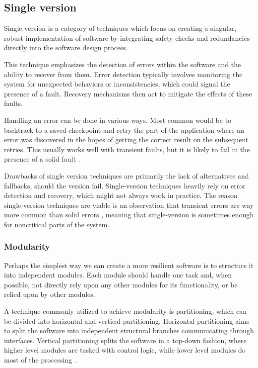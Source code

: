 
\subsection{Single version} \label{single}

Single version is a category of techniques which focus on creating a singular, robust implementation of software by integrating safety checks and redundancies directly into the software design process.

This technique emphasizes the detection of errors within the software and the ability to recover from them. Error detection typically involves monitoring the system for unexpected behaviors or inconsistencies, which could signal the presence of a fault. Recovery mechanisms then act to mitigate the effects of these faults.

Handling an error can be done in various ways. Most common would be to backtrack to a saved checkpoint and retry the part of the application where an error was discovered in the hopes of getting the correct result on the subsequent retries. This usually works well with transient faults, but it is likely to fail in the presence of a solid fault \cite{1402092}. 

Drawbacks of single version techniques are primarily the lack of alternatives and fallbacks, should the version fail. Single-version techniques heavily rely on error detection and recovery, which might not always work in practice. The reason single-version techniques are viable is an observation that transient errors are way more common than solid errors \cite{1676899}, meaning that single-version is sometimes enough for noncritical parts of the system.

\subsubsection{Modularity}

Perhaps the simplest way we can create a more resilient software is to structure it into independent modules. Each module should handle one task and, when possible, not directly rely upon any other modules for its functionality, or be relied upon by other modules.

A technique commonly utilized to achieve modularity is partitioning, which can be divided into horizontal and vertical partitioning. Horizontal partitioning aims to split the software into independent structural branches communicating through interfaces. 
Vertical partitioning splits the software in a top-down fashion, where higher level modules are tasked with control logic, while lower level modules do most of the processing \cite{nasa:sft}.

